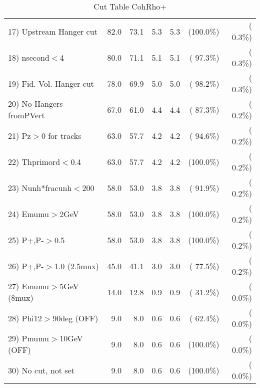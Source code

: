 \begin{table}[h!]
\begin{tabular}{||l||r|r|r|r|r|r||}
 17) Upstream Hanger cut  &         82.0 &         73.1 &          5.3 &          5.3 & (100.0\%) & (  0.3\%) \\
 18) nsecond$<$4          &         80.0 &         71.1 &          5.1 &          5.1 & ( 97.3\%) & (  0.3\%) \\
 19) Fid. Vol. Hanger cut &         78.0 &         69.9 &          5.0 &          5.0 & ( 98.2\%) & (  0.3\%) \\
 20) No Hangers fromPVert &         67.0 &         61.0 &          4.4 &          4.4 & ( 87.3\%) & (  0.2\%) \\
 21) Pz$>$0 for tracks    &         63.0 &         57.7 &          4.2 &          4.2 & ( 94.6\%) & (  0.2\%) \\
 22) Thprimord$<$0.4      &         63.0 &         57.7 &          4.2 &          4.2 & (100.0\%) & (  0.2\%) \\
 23) Nunh*fracunh$<$200   &         58.0 &         53.0 &          3.8 &          3.8 & ( 91.9\%) & (  0.2\%) \\
 24) Emumu$>$2GeV         &         58.0 &         53.0 &          3.8 &          3.8 & (100.0\%) & (  0.2\%) \\
 25) P+,P-$>$0.5          &         58.0 &         53.0 &          3.8 &          3.8 & (100.0\%) & (  0.2\%) \\
 26) P+,P-$>$1.0 (2.5mux) &         45.0 &         41.1 &          3.0 &          3.0 & ( 77.5\%) & (  0.2\%) \\
 27) Emumu$>$5GeV  (8mux) &         14.0 &         12.8 &          0.9 &          0.9 & ( 31.2\%) & (  0.0\%) \\
 28) Phi12$>$90deg  (OFF) &          9.0 &          8.0 &          0.6 &          0.6 & ( 62.4\%) & (  0.0\%) \\
 29) Pmumu$>$10GeV  (OFF) &          9.0 &          8.0 &          0.6 &          0.6 & (100.0\%) & (  0.0\%) \\
 30) No cut, not set      &          9.0 &          8.0 &          0.6 &          0.6 & (100.0\%) & (  0.0\%) \\
 \hline
 \hline
 \end{tabular}
 \caption{Cut Table  CohRho+  }
 \label{tab-cutcohjpsi-mumu_anumunc}
 \end{table}
